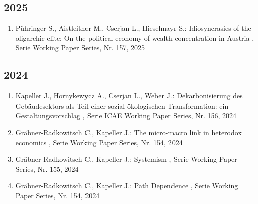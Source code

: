 \begin{enumerate}[leftmargin=*, labelsep=0.5cm]
\end{enumerate} 
 \subsection*{2025} 
 \begin{enumerate}[leftmargin=*, labelsep=0.5cm] 
	 \item Pühringer S., Aistleitner M., Cserjan L., Hieselmayr S.:  Idiosyncrasies of the oligarchic elite: On the political economy of wealth concentration in Austria  , Serie Working Paper Series, Nr. 157, 2025
\end{enumerate} 
 \subsection*{2024} 
 \begin{enumerate}[leftmargin=*, labelsep=0.5cm] 
	 \item Kapeller J., Hornykewycz A., Cserjan L., Weber J.:  Dekarbonisierung des Gebäudesektors als Teil einer sozial-ökologischen Transformation: ein Gestaltungsvorschlag  , Serie ICAE Working Paper Series, Nr. 156, 2024
	 \item Gräbner-Radkowitsch C., Kapeller J.:  The micro-macro link in heterodox economics  , Serie Working Paper Series, Nr. 154, 2024
	 \item Gräbner-Radkowitsch C., Kapeller J.:  Systemism  , Serie Working Paper Series, Nr. 155, 2024
	 \item Gräbner-Radkowitsch C., Kapeller J.:  Path Dependence  , Serie Working Paper Series, Nr. 154, 2024
\end{enumerate} 

